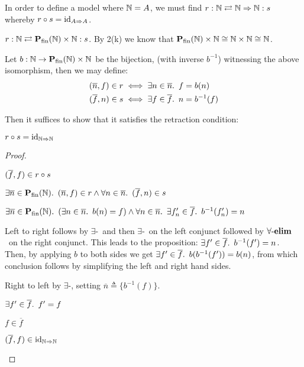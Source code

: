 In order to define a model where $\mathbb{N} = A$, we must find ${r : \mathbb{N}\rightleftarrows\mathbb{N}\Rightarrow\mathbb{N} : s}$ whereby $r\circ s = \operatorname{id}_{A\Rightarrow A}$.
\begin{itemize}
  \step[\iffs] $r : \mathbb{N} \rightleftarrows\mathbf{P}_{\operatorname{fin}}(\mathbb{N})\times\mathbb{N} : s$.
  \step By 2(k) we know that $\mathbf{P}_{\operatorname{fin}}(\mathbb{N})\times\mathbb{N}\cong\mathbb{N}\times\mathbb{N}\cong\mathbb{N}$.

  \step Let ${b : \mathbb{N}\to\mathbf{P}_{\operatorname{fin}}(\mathbb{N})\times\mathbb{N}}$ be the bijection, (with inverse $b^{-1}$) witnessing the above isomorphism, then we may define:
    \begin{align*}
      (\overline{n},f)\in r & \iff\exists n\in\overline{n}\ldotp~f = b(n)\\
      (\overline{f},n)\in s & \iff\exists f\in\overline{f}\ldotp~n = b^{-1}(f)\\
    \end{align*}

    \step
      Then it suffices to show that it satisfies the retraction condition:
\end{itemize}
\begin{prop}
  $r\circ s = \operatorname{id}_{\mathbb{N}\Rightarrow\mathbb{N}}$
  \begin{proof}~\\
  \begin{itemize}
  \step $(\overline{f},f)\in r\circ s$

  \step[\iffs]
    $\exists\overline{n}\in\mathbf{P}_{\operatorname{fin}}(\mathbb{N})\ldotp~(\overline{n},f)\in r\land\forall n\in\overline{n}\ldotp~(\overline{f},n)\in s$

  \step[\iffs]
    $\exists\overline{n}\in\mathbf{P}_{\operatorname{fin}}(\mathbb{N})\ldotp~(\exists n\in\overline{n}\ldotp~b(n) = f)\land\forall n\in\overline{n}\ldotp~\exists f^\prime_n\in\overline{f}\ldotp~b^{-1}(f^\prime_n) = n$

  \step
    Left to right follows by $\exists$-\Elim~and then $\exists$-\Elim~on the left conjunct followed by ${\forall\text{-\textbf{elim}}}$~on the right conjunct. This leads to the proposition: ${\exists f^\prime\in\overline{f}\ldotp~b^{-1}(f^\prime) = n}$. Then, by applying $b$ to both sides we get ${\exists f^\prime\in\overline{f}\ldotp~b(b^{-1}(f^\prime)) = b(n)}$, from which conclusion follows by simplifying the left and right hand sides.

  \step
    Right to left by $\exists$-\Intro, setting $\overline{n}\triangleq\{b^{-1}(f)\}$.

  \step[\iffs]
    $\exists f^\prime\in\overline{f}\ldotp~f^\prime = f$

  \step[\iffs]
    $f\in\overline{f}$

  \step[\iffs]
    $(\overline{f}, f)\in\operatorname{id}_{\mathbb{N}\Rightarrow\mathbb{N}}$
    \marginnote{\Def-$\id$}
    \qedhere
  \end{itemize}
  \end{proof}
\end{prop}

